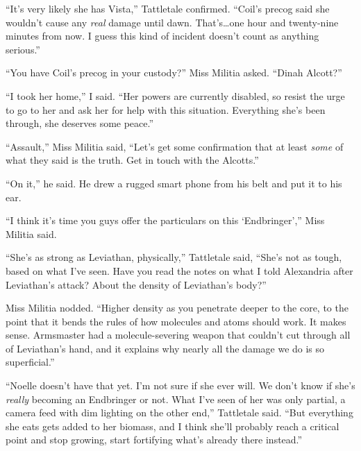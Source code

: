 ``It's very likely she has Vista,'' Tattletale confirmed.  ``Coil's precog said she wouldn't cause any \emph{real} damage until dawn.  That's\ldots one hour and twenty-nine minutes from now.  I guess this kind of incident doesn't count as anything serious.''



``You have Coil's precog in your custody?''  Miss Militia asked.  ``Dinah Alcott?''



``I took her home,'' I said.  ``Her powers are currently disabled, so resist the urge to go to her and ask her for help with this situation.  Everything she's been through, she deserves some peace.''



``Assault,'' Miss Militia said, ``Let's get some confirmation that at least \emph{some} of what they said is the truth.  Get in touch with the Alcotts.''



``On it,'' he said.  He drew a rugged smart phone from his belt and put it to his ear.



``I think it's time you guys offer the particulars on this `Endbringer','' Miss Militia said.



``She's as strong as Leviathan, physically,'' Tattletale said, ``She's not as tough, based on what I've seen.  Have you read the notes on what I told Alexandria after Leviathan's attack?  About the density of Leviathan's body?''



Miss Militia nodded.  ``Higher density as you penetrate deeper to the core, to the point that it bends the rules of how molecules and atoms should work.  It makes sense.  Armsmaster had a molecule-severing weapon that couldn't cut through all of Leviathan's hand, and it explains why nearly all the damage we do is so superficial.''



``Noelle doesn't have that yet.  I'm not sure if she ever will.  We don't know if she's \emph{really} becoming an Endbringer or not.  What I've seen of her was only partial, a camera feed with dim lighting on the other end,'' Tattletale said.  ``But everything she eats gets added to her biomass, and I think she'll probably reach a critical point and stop growing, start fortifying what's already there instead.''



